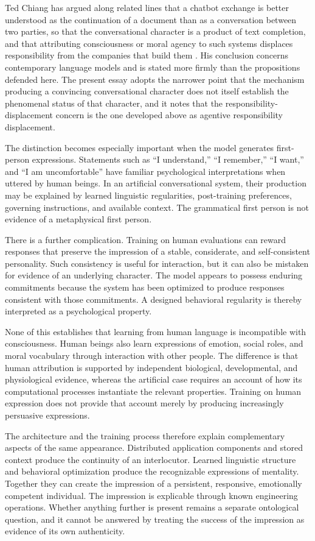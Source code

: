 \documentclass[12pt]{article}
\theoremstyle{definition}
\begin{document}
Ted Chiang has argued along related lines that a chatbot exchange is better understood as the continuation of a document than as a conversation between two parties, so that the conversational character is a product of text completion, and that attributing consciousness or moral agency to such systems displaces responsibility from the companies that build them \cite{chiang2026}. His conclusion concerns contemporary language models and is stated more firmly than the propositions defended here. The present essay adopts the narrower point that the mechanism producing a convincing conversational character does not itself establish the phenomenal status of that character, and it notes that the responsibility-displacement concern is the one developed above as agentive responsibility displacement.

The distinction becomes especially important when the model generates first-person expressions. Statements such as ``I understand,'' ``I remember,'' ``I want,'' and ``I am uncomfortable'' have familiar psychological interpretations when uttered by human beings. In an artificial conversational system, their production may be explained by learned linguistic regularities, post-training preferences, governing instructions, and available context. The grammatical first person is not evidence of a metaphysical first person.

There is a further complication. Training on human evaluations can reward responses that preserve the impression of a stable, considerate, and self-consistent personality. Such consistency is useful for interaction, but it can also be mistaken for evidence of an underlying character. The model appears to possess enduring commitments because the system has been optimized to produce responses consistent with those commitments. A designed behavioral regularity is thereby interpreted as a psychological property.

None of this establishes that learning from human language is incompatible with consciousness. Human beings also learn expressions of emotion, social roles, and moral vocabulary through interaction with other people. The difference is that human attribution is supported by independent biological, developmental, and physiological evidence, whereas the artificial case requires an account of how its computational processes instantiate the relevant properties. Training on human expression does not provide that account merely by producing increasingly persuasive expressions.

The architecture and the training process therefore explain complementary aspects of the same appearance. Distributed application components and stored context produce the continuity of an interlocutor. Learned linguistic structure and behavioral optimization produce the recognizable expressions of mentality. Together they can create the impression of a persistent, responsive, emotionally competent individual. The impression is explicable through known engineering operations. Whether anything further is present remains a separate ontological question, and it cannot be answered by treating the success of the impression as evidence of its own authenticity.
\end{document}
